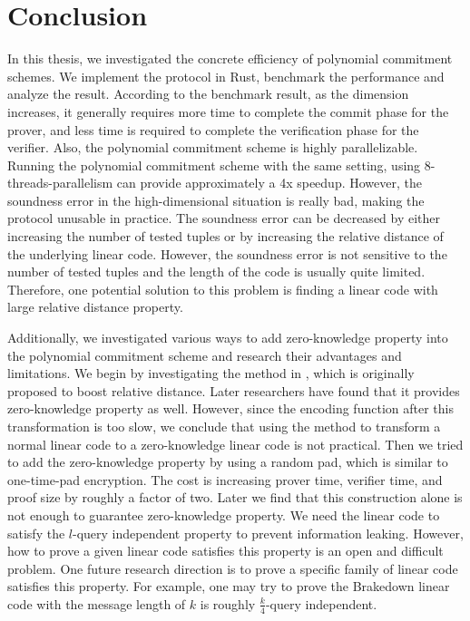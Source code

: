 \chapter{Conclusion}

In this thesis, we investigated the concrete efficiency of polynomial commitment schemes. We implement the protocol in Rust, benchmark the performance and analyze the result.
According to the benchmark result, as the dimension increases, it generally requires more time to complete the commit phase for the prover, and less time is required to complete the verification phase for the verifier. Also, the polynomial commitment scheme is highly parallelizable. Running the polynomial commitment scheme with the same setting, using
8-threads-parallelism can provide approximately a 4x speedup. However, the soundness error in the high-dimensional situation is really bad, making the protocol unusable in practice. The soundness error can be decreased by either increasing the number of tested tuples or by increasing the relative distance of the underlying linear code. However, the soundness error is not sensitive to the number of tested tuples and the length of the code is usually quite limited. Therefore, one potential solution to this problem is finding a linear code with large relative distance property.


Additionally, we investigated various ways to add zero-knowledge property into the polynomial commitment scheme and research their advantages and limitations. 
We begin by investigating the method in \cite{10.1145/2554797.2554815}, which is originally proposed to boost relative distance. Later researchers have found that it provides zero-knowledge property as well. However, since the encoding function after this transformation is too slow, we conclude that using the method to transform a normal linear code to a zero-knowledge linear code is not practical. Then we tried to add the zero-knowledge property by using a random pad, which is similar to one-time-pad encryption.
The cost is increasing prover time, verifier time, and proof size by roughly a factor of two. Later we find that this construction alone is not enough to guarantee zero-knowledge property. We need the linear code to satisfy the $l$-query independent property to prevent information leaking. However, how to prove a given linear code satisfies this property is an open and difficult problem. One future research direction is to prove a specific family of linear code satisfies this property. For example, one may try to prove the Brakedown linear code with the message length of $k$ is roughly $\frac{k}{4}$-query independent.
